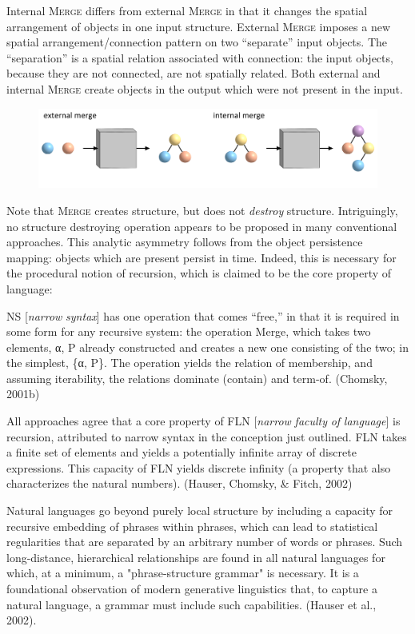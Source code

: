   Internal \textsc{Merge} differs from external \textsc{Merge} in that it changes the spatial arrangement of objects in one input structure. External \textsc{Merge} imposes a new spatial arrangement/connection pattern on two “separate” input objects. The “separation” is a spatial relation associated with connection: the input objects, because they are not connected, are not spatially related. Both external and internal \textsc{Merge} create objects in the output which were not present in the input. 

  
\begin{figure}
\includegraphics[width=\textwidth]{figures/Tilsen-img109.png}
\caption{\missingcaption}
\label{fig:}
\end{figure}
 

  Note that \textsc{Merge} creates structure, but does not \textit{destroy} structure. Intriguingly, no structure destroying operation appears to be proposed in many conventional approaches. This analytic asymmetry follows from the object persistence mapping: objects which are present persist in time. Indeed, this is necessary for the procedural notion of recursion, which is claimed to be the core property of language:

NS [\textit{narrow} \textit{syntax}] has one operation that comes “free,” in that it is required in some form for any recursive system: the operation Merge, which takes two elements, α, P already constructed and creates a new one consisting of the two; in the simplest, \{α, P\}. The operation yields the relation of membership, and assuming iterability, the relations dominate (contain) and term-of. (Chomsky, 2001b)

All approaches agree that a core property of FLN [\textit{narrow} \textit{faculty} \textit{of} \textit{language}] is recursion, attributed to narrow syntax in the conception just outlined. FLN takes a finite set of elements and yields a potentially infinite array of discrete expressions. This capacity of FLN yields discrete infinity (a property that also characterizes the natural numbers). (Hauser, Chomsky, \& Fitch, 2002)

Natural languages go beyond purely local structure by including a capacity for recursive embedding of phrases within phrases, which can lead to statistical regularities that are separated by an arbitrary number of words or phrases. Such long-distance, hierarchical relationships are found in all natural languages for which, at a minimum, a "phrase-structure grammar" is necessary. It is a foundational observation of modern generative linguistics that, to capture a natural language, a grammar must include such capabilities. (Hauser et al., 2002). 

